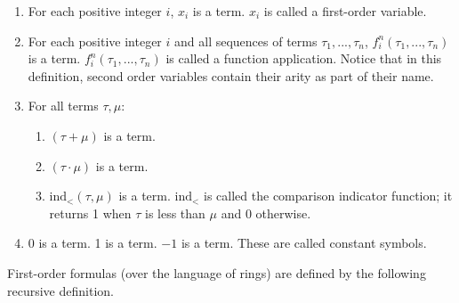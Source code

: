\documentclass[11pt]{article}
\begin{document}
\begin{enumerate}
	\item For each positive integer $i$, $x_i$ is a term. $x_i$ is called a first-order variable.
	\item For each positive integer $i$ and all sequences of terms $\tau_1, ..., \tau_n$, $f^n_i(\tau_1, ..., \tau_n)$ is a term.
		$f^n_i(\tau_1, ..., \tau_n)$ is called a function application. Notice that in this
		definition, second order variables contain their arity as part of their name.
	\item For all terms $\tau, \mu$:
		\begin{enumerate}
			\item $(\tau + \mu)$ is a term.
			\item $(\tau \cdot \mu)$ is a term.
			\item $\text{ind}_<(\tau, \mu)$ is a term. $\text{ind}_<$ is called the
				comparison indicator function; it returns 1 when $\tau$ is less
				than $\mu$ and 0 otherwise.
		\end{enumerate}
	\item $0$ is a term. 1 is a term. $-1$ is a term. These are called constant symbols.
\end{enumerate}

First-order formulas (over the language of rings) are defined by the following recursive definition.
\end{document}

